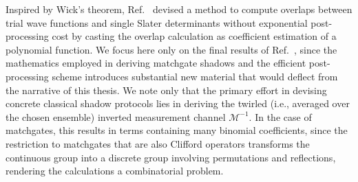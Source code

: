 \documentclass[../main.tex]{subfiles}
\begin{document}
Inspired by Wick's theorem, Ref.~\cite{wan2022matchgate} devised a method to compute overlaps between trial wave functions and single Slater determinants without exponential post-processing cost by casting the overlap calculation as coefficient estimation of a polynomial function. We focus here only on the final results of Ref.~\cite{wan2022matchgate}, since the mathematics employed in deriving matchgate shadows and the efficient post-processing scheme introduces substantial new material that would deflect from the narrative of this thesis. We note only that the primary effort in devising concrete classical shadow protocols lies in deriving the twirled (i.e., averaged over the chosen ensemble) inverted measurement channel $\mathcal{M}^{-1}$. In the case of matchgates, this results in terms containing many binomial coefficients, since the restriction to matchgates that are also Clifford operators transforms the continuous group into a discrete group involving permutations and reflections, rendering the calculations a combinatorial problem.
\end{document}
